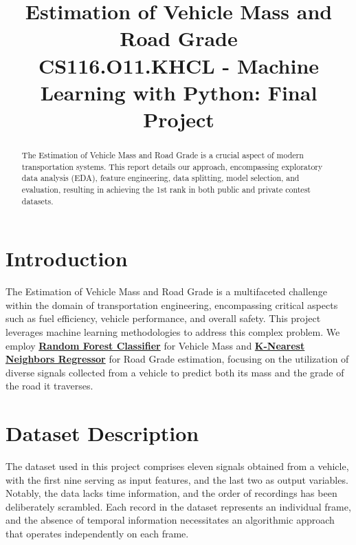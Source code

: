 \documentclass[conference]{IEEEtran}
\begin{document}
\title{Estimation of Vehicle Mass and Road Grade\\
{\footnotesize \large CS116.O11.KHCL - Machine Learning with Python: Final Project}
}

\author{ 
}

\maketitle

\begin{abstract}
    The Estimation of Vehicle Mass and Road Grade is a crucial aspect of modern transportation systems. This report details our approach, encompassing exploratory data analysis (EDA), feature engineering, data splitting, model selection, and evaluation, resulting in achieving the 1st rank in both public and private contest datasets.
\end{abstract}


\section{Introduction}
The Estimation of Vehicle Mass and Road Grade is a multifaceted challenge within the domain of transportation engineering, encompassing critical aspects such as fuel efficiency, vehicle performance, and overall safety. This project leverages machine learning methodologies to address this complex problem. We employ \href{https://scikit-learn.org/stable/modules/generated/sklearn.ensemble.RandomForestClassifier.html}{\textbf{Random Forest Classifier}} for Vehicle Mass and \href{https://scikit-learn.org/stable/modules/generated/sklearn.neighbors.KNeighborsRegressor.html}{\textbf{K-Nearest Neighbors Regressor}} for Road Grade estimation, focusing on the utilization of diverse signals collected from a vehicle to predict both its mass and the grade of the road it traverses.

\section{Dataset Description}
The dataset used in this project comprises eleven signals obtained from a vehicle, with the first nine serving as input features, and the last two as output variables. Notably, the data lacks time information, and the order of recordings has been deliberately scrambled. Each record in the dataset represents an individual frame, and the absence of temporal information necessitates an algorithmic approach that operates independently on each frame.
\end{document}
